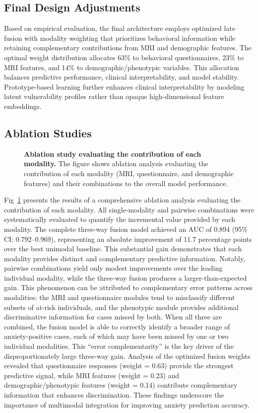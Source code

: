 \documentclass[10pt,letterpaper]{article}
\begin{document}
\subsection*{Final Design Adjustments}

Based on empirical evaluation, the final architecture employs optimized late fusion with modality weighting that prioritizes behavioral information while retaining complementary contributions from MRI and demographic features. The optimal weight distribution allocates 63\% to behavioral questionnaires, 23\% to MRI features, and 14\% to demographic/phenotypic variables. This allocation balances predictive performance, clinical interpretability, and model stability. Prototype-based learning further enhances clinical interpretability by modeling latent vulnerability profiles rather than opaque high-dimensional feature embeddings.

\subsection*{Ablation Studies}

\begin{figure}[!h]
\caption{\textbf{Ablation study evaluating the contribution of each modality.}
The figure shows ablation analysis evaluating the contribution of each modality (MRI, questionnaire, and demographic features) and their combinations to the overall model performance.}
\label{fig:ablation_analysis}
\end{figure}

Fig~\ref{fig:ablation_analysis} presents the results of a comprehensive ablation analysis evaluating the contribution of each modality. All single-modality and pairwise combinations were systematically evaluated to quantify the incremental value provided by each modality. The complete three-way fusion model achieved an AUC of 0.894 (95\% CI: 0.792--0.969), representing an absolute improvement of 11.7 percentage points over the best unimodal baseline. This substantial gain demonstrates that each modality provides distinct and complementary predictive information. Notably, pairwise combinations yield only modest improvements over the leading individual modality, while the three-way fusion produces a larger-than-expected gain. This phenomenon can be attributed to complementary error patterns across modalities: the MRI and questionnaire modules tend to misclassify different subsets of at-risk individuals, and the phenotypic module provides additional discriminative information for cases missed by both. When all three are combined, the fusion model is able to correctly identify a broader range of anxiety-positive cases, each of which may have been missed by one or two individual modalities. This ``error complementarity'' is the key driver of the disproportionately large three-way gain. Analysis of the optimized fusion weights revealed that questionnaire responses (weight = 0.63) provide the strongest predictive signal, while MRI features (weight = 0.23) and demographic/phenotypic features (weight = 0.14) contribute complementary information that enhances discrimination. These findings underscore the importance of multimodal integration for improving anxiety prediction accuracy.
\end{document}
